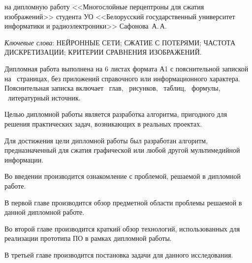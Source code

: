 \thispagestyle{empty}

\begin{center}
  \begin{minipage}{0.82\textwidth}
    на дипломную работу <<Многослойные перцептроны для сжатия изображений>> студента УО <<Белорусский государственный университет информатики и радиоэлектроники>> Сафонова~А.\,А.
  \end{minipage}
\end{center}

\emph{Ключевые слова}: НЕЙРОННЫЕ СЕТИ; СЖАТИЕ С ПОТЕРЯМИ; ЧАСТОТА ДИСКРЕТИЗАЦИИ; КРИТЕРИИ СРАВНЕНИЯ ИЗОБРАЖЕНИЙ.

\vspace{4\parsep}

Дипломная работа выполнена на 6 листах формата А1 с пояснительной запиской на~\pageref*{LastPage} страницах, без приложений справочного или информационного характера.
Пояснительная записка включает ~глав, \totfig{}~рисунков, \tottab{}~таблиц, \toteq{}~формулы, \totref{}~литературный источник.

Целью дипломной работы является разработка алгоритма, пригодного для решения практических задач, возникающих в реальных проектах.%

Для достижения цели дипломной работы был разработан алгоритм, предназначенный для сжатия графической или любой другой мультимедийной информации.

Во введении производится ознакомление с проблемой, решаемой в дипломной работе.

В первой главе производится обзор предметной области проблемы решаемой в данной дипломной работе.

Во второй главе производится краткий обзор технологий, использованных для реализации прототипа ПО в рамках дипломной работы.

В третьей главе производится постановка задачи для данного исследования.

